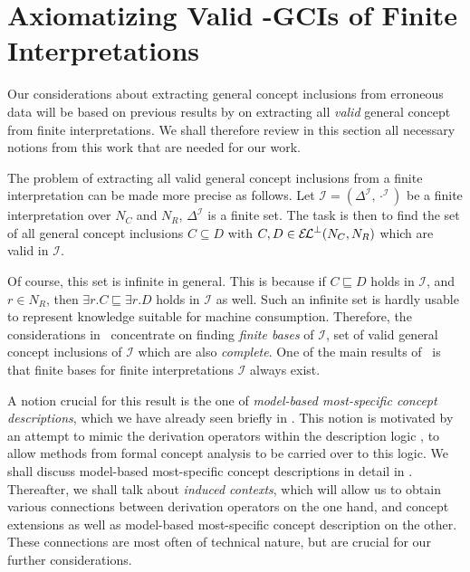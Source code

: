 \chapter{Axiomatizing Valid \EL-GCIs of Finite Interpretations}
\label{cha:axiom-valid-el}

Our considerations about extracting general concept inclusions from erroneous data will be
based on previous results by \textcite{Diss-Felix} on extracting all \emph{valid} general
concept from finite interpretations.  We shall therefore review in this section all
necessary notions from this work that are needed for our work.

The problem of extracting all valid general concept inclusions from a finite
interpretation can be made more precise as follows.  Let $\mathcal{I} =
(\Delta^{\mathcal{I}}, \cdot^{\mathcal{I}})$ be a finite interpretation over $N_C$ and
$N_R$, \ie $\Delta^{\mathcal{I}}$ is a finite set.  The task is then to find the set of
all general concept inclusions $C \subseteq D$ with $C, D \in {\ensuremath{{\mathcal{E}\kern-.3ex\mathcal{L}}^\bot}}(N_C, N_R)$ which are
valid in $\mathcal{I}$.

Of course, this set is infinite in general.  This is because if $C \sqsubseteq D$ holds in
$\mathcal{I}$, and $r \in N_R$, then $\exists r. C \sqsubseteq \exists r. D$ holds in
$\mathcal{I}$ as well.  Such an infinite set is hardly usable to represent knowledge
suitable for machine consumption.  Therefore, the considerations in~\cite{Diss-Felix}
concentrate on finding \emph{finite bases} of $\mathcal{I}$, \ie set of valid general
concept inclusions of $\mathcal{I}$ which are also \emph{complete}.  One of the main
results of~\cite{Diss-Felix} is that finite bases for finite interpretations $\mathcal{I}$
always exist.

A notion crucial for this result is the one of \emph{model-based most-specific concept
  descriptions}, which we have already seen briefly in .
This notion is motivated by an attempt to mimic the derivation operators within the
description logic \ELbot, to allow methods from formal concept analysis to be carried over
to this logic.  We shall discuss model-based most-specific concept descriptions in detail
in .  Thereafter, we shall talk about \emph{induced contexts}, which
will allow us to obtain various connections between derivation operators on the one hand,
and concept extensions as well as model-based most-specific concept description on the
other.  These connections are most often of technical nature, but are crucial for our
further considerations.




